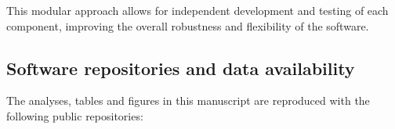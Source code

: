 \documentclass{article}
\begin{document}

%



This modular approach allows for independent development and testing of each component, improving the overall robustness and flexibility of the software.

\subsection{Software repositories and data availability}
\label{sec:repos}

The analyses, tables and figures in this manuscript are reproduced with the
following public repositories:
\end{document}
